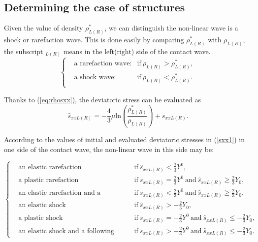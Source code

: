 \documentclass{article}
\numberwithin{equation}{section}
\numberwithin{table}{section}
\begin{document}
\subsection{Determining the case of structures} \label{sec:deter}

Given the value of density $\rho^*_{L(R)}$, we can distinguish the non-linear wave is a shock or rarefaction wave.  This is done easily by comparing $\rho^*_{L(R)}$ with $\rho_{L(R)}$, the subscript $_{L(R)}$ means in the left(right) side of the contact wave.
\begin{equation}\label{shock1}
  \left\{
  \begin{aligned}
	& \text{a rarefaction wave:} & \text{if} \ \rho_{L(R)} > \rho_{L(R)}^*,\\
	& \text{a shock wave:} &   \text{if} \ \rho_{L(R)} < \rho_{L(R)}^*.\\
\end{aligned}\right.
\end{equation}

Thanks to (\ref{eq:rhosxx}),
the deviatoric stress can be evaluated as
\begin{equation}  \label{sxx1}
\hat{s}_{xxL(R)}=-\frac{4}{3}\mu\text{ln}\left(\frac{\rho_{L(R)}^*}{\rho_{L(R)}}\right)+s_{xxL(R)}.
\end{equation}

According to the values of initial and evaluated deviatoric stresses in (\ref{sxx1}) in one side of the contact wave, the non-linear wave in this side may be:

{\color{red}
\begin{equation} \label{yield1}
  \left\{
  \begin{aligned}
	& \text{an elastic  rarefaction} & \text{if}  \ \hat{s}_{xxL(R)}<\frac{2}{3}Y^{0},\\
	& \text{a plastic rarefaction} & \text{if} \ {s}_{xxL(R)} = \frac{2}{3}Y^{0} \ \text{and} \ \hat{s}_{xxL(R)} \geq \frac{2}{3}Y_{0},\\
	& \text{an elastic rarefaction  and a following plastic rarefaction} &  \text{if} \ {s}_{xxL(R)} < \frac{2}{3}Y^{0} \ \text{and} \ \hat{s}_{xxL(R)} \geq \frac{2}{3}Y_{0},\\
	& \text{an elastic shock} & \text{if}  \ \hat{s}_{xxL(R)}> -\frac{2}{3}Y_{0},\\
	& \text{a plastic shock} & \text{if} \ {s}_{xxL(R)} = -\frac{2}{3}Y^{0} \ \text{and} \ \hat{s}_{xxL(R)} \leq -\frac{2}{3}Y_{0},\\
	& \text{an elastic shock and a following plastic shock} &  \text{if} \ {s}_{xxL(R)} > -\frac{2}{3}Y^{0} \ \text{and} \ \hat{s}_{xxL(R)} \leq -\frac{2}{3}Y_{0}.
\end{aligned}\right.
\end{equation}
}
\end{document}
